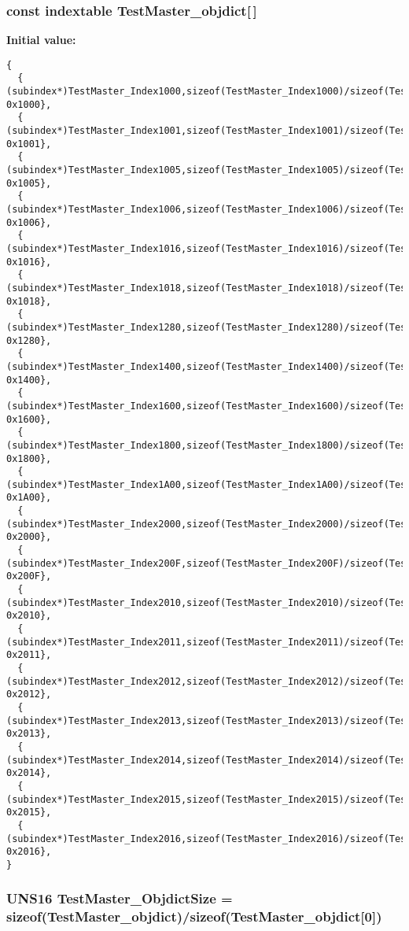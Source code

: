 \subsubsection{\setlength{\rightskip}{0pt plus 5cm}const {\bf indextable} {\bf Test\-Master\_\-objdict}[$\,$]}\label{TestMasterMicroMod_2TestMaster_8c_de34deafe2812ee6dcd965d402ef8da4}


\textbf{Initial value:}

\begin{Code}\begin{verbatim} 
{
  { (subindex*)TestMaster_Index1000,sizeof(TestMaster_Index1000)/sizeof(TestMaster_Index1000[0]), 0x1000},
  { (subindex*)TestMaster_Index1001,sizeof(TestMaster_Index1001)/sizeof(TestMaster_Index1001[0]), 0x1001},
  { (subindex*)TestMaster_Index1005,sizeof(TestMaster_Index1005)/sizeof(TestMaster_Index1005[0]), 0x1005},
  { (subindex*)TestMaster_Index1006,sizeof(TestMaster_Index1006)/sizeof(TestMaster_Index1006[0]), 0x1006},
  { (subindex*)TestMaster_Index1016,sizeof(TestMaster_Index1016)/sizeof(TestMaster_Index1016[0]), 0x1016},
  { (subindex*)TestMaster_Index1018,sizeof(TestMaster_Index1018)/sizeof(TestMaster_Index1018[0]), 0x1018},
  { (subindex*)TestMaster_Index1280,sizeof(TestMaster_Index1280)/sizeof(TestMaster_Index1280[0]), 0x1280},
  { (subindex*)TestMaster_Index1400,sizeof(TestMaster_Index1400)/sizeof(TestMaster_Index1400[0]), 0x1400},
  { (subindex*)TestMaster_Index1600,sizeof(TestMaster_Index1600)/sizeof(TestMaster_Index1600[0]), 0x1600},
  { (subindex*)TestMaster_Index1800,sizeof(TestMaster_Index1800)/sizeof(TestMaster_Index1800[0]), 0x1800},
  { (subindex*)TestMaster_Index1A00,sizeof(TestMaster_Index1A00)/sizeof(TestMaster_Index1A00[0]), 0x1A00},
  { (subindex*)TestMaster_Index2000,sizeof(TestMaster_Index2000)/sizeof(TestMaster_Index2000[0]), 0x2000},
  { (subindex*)TestMaster_Index200F,sizeof(TestMaster_Index200F)/sizeof(TestMaster_Index200F[0]), 0x200F},
  { (subindex*)TestMaster_Index2010,sizeof(TestMaster_Index2010)/sizeof(TestMaster_Index2010[0]), 0x2010},
  { (subindex*)TestMaster_Index2011,sizeof(TestMaster_Index2011)/sizeof(TestMaster_Index2011[0]), 0x2011},
  { (subindex*)TestMaster_Index2012,sizeof(TestMaster_Index2012)/sizeof(TestMaster_Index2012[0]), 0x2012},
  { (subindex*)TestMaster_Index2013,sizeof(TestMaster_Index2013)/sizeof(TestMaster_Index2013[0]), 0x2013},
  { (subindex*)TestMaster_Index2014,sizeof(TestMaster_Index2014)/sizeof(TestMaster_Index2014[0]), 0x2014},
  { (subindex*)TestMaster_Index2015,sizeof(TestMaster_Index2015)/sizeof(TestMaster_Index2015[0]), 0x2015},
  { (subindex*)TestMaster_Index2016,sizeof(TestMaster_Index2016)/sizeof(TestMaster_Index2016[0]), 0x2016},
}
\end{verbatim}\end{Code}
\subsubsection{\setlength{\rightskip}{0pt plus 5cm}UNS16 {\bf Test\-Master\_\-Objdict\-Size} = sizeof({\bf Test\-Master\_\-objdict})/sizeof({\bf Test\-Master\_\-objdict}[0])}\label{TestMasterMicroMod_2TestMaster_8c_827827be557e9e59d6ba299f812aad66}


